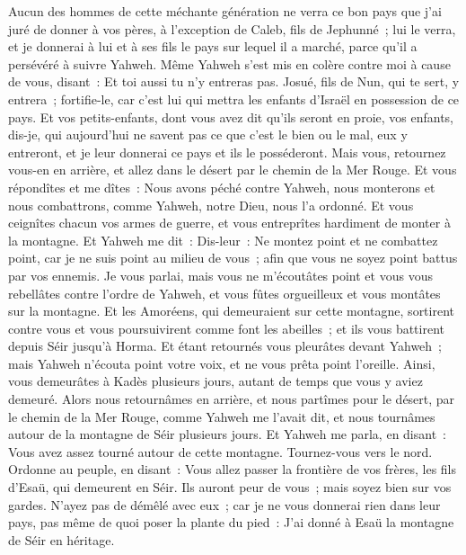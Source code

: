 \begin{multicols}{2}
Aucun des hommes de cette méchante génération ne verra ce bon pays que j'ai juré de donner à vos pères,
à l'exception de Caleb, fils de Jephunné~; lui le verra, et je donnerai à lui et à ses fils le pays sur lequel il a marché, parce qu'il a persévéré à suivre Yahweh.
Même Yahweh s'est mis en colère contre moi à cause de vous, disant~: Et toi aussi tu n'y entreras pas.
Josué, fils de Nun, qui te sert, y entrera~; fortifie-le, car c'est lui qui mettra les enfants d'Israël en possession de ce pays.
Et vos petits-enfants, dont vous avez dit qu'ils seront en proie, vos enfants, dis-je, qui aujourd'hui ne savent pas ce que c'est le bien ou le mal, eux y entreront, et je leur donnerai ce pays et ils le posséderont.
Mais vous, retournez vous-en en arrière, et allez dans le désert par le chemin de la Mer Rouge.
Et vous répondîtes et me dîtes~: Nous avons péché contre Yahweh, nous monterons et nous combattrons, comme Yahweh, notre Dieu, nous l'a ordonné. Et vous ceignîtes chacun vos armes de guerre, et vous entreprîtes hardiment de monter à la montagne.
Et Yahweh me dit~: Dis-leur~: Ne montez point et ne combattez point, car je ne suis point au milieu de vous~; afin que vous ne soyez point battus par vos ennemis.
Je vous parlai, mais vous ne m'écoutâtes point et vous vous rebellâtes contre l'ordre de Yahweh, et vous fûtes orgueilleux et vous montâtes sur la montagne.
Et les Amoréens, qui demeuraient sur cette montagne, sortirent contre vous et vous poursuivirent comme font les abeilles~; et ils vous battirent depuis Séir jusqu'à Horma.
Et étant retournés vous pleurâtes devant Yahweh~; mais Yahweh n'écouta point votre voix, et ne vous prêta point l'oreille.
Ainsi, vous demeurâtes à Kadès plusieurs jours, autant de temps que vous y aviez demeuré.
\VerseOne{}Alors nous retournâmes en arrière, et nous partîmes pour le désert, par le chemin de la Mer Rouge, comme Yahweh me l'avait dit, et nous tournâmes autour de la montagne de Séir plusieurs jours.
Et Yahweh me parla, en disant~:
Vous avez assez tourné autour de cette montagne. Tournez-vous vers le nord.
Ordonne au peuple, en disant~: Vous allez passer la frontière de vos frères, les fils d'Esaü, qui demeurent en Séir. Ils auront peur de vous~; mais soyez bien sur vos gardes.
N'ayez pas de démêlé avec eux~; car je ne vous donnerai rien dans leur pays, pas même de quoi poser la plante du pied~: J'ai donné à Esaü la montagne de Séir en héritage.

\end{multicols}
